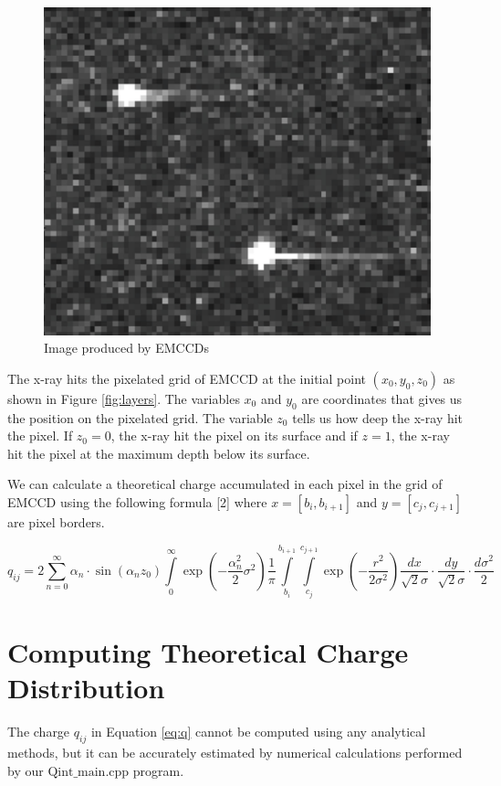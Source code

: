 \documentclass{article}
\begin{document}
\begin{figure}[H]
    \centering
    \includegraphics[width=0.6\linewidth]{images/emccd.png}
    \caption{Image produced by EMCCDs}
    \label{fig:emccd}
\end{figure}

The x-ray hits the pixelated grid of EMCCD at the initial point $(x_0, y_0, z_0)$ as shown in Figure \ref{fig:layers}. The variables $x_0$ and $y_0$ are coordinates that gives us the position on the pixelated grid. The variable $z_0$ tells us how deep the x-ray hit the pixel. If $z_0=0$, the x-ray hit the pixel on its surface and if $z=1$, the x-ray hit the pixel at the maximum depth below its surface.

We can calculate a theoretical charge accumulated in each pixel in the grid of EMCCD using the following formula [2] where $x = [b_i, b_{i+1}]$ and $y = [c_j, c_{j+1}]$ are pixel borders.

\begin{equation} 
\label{eq:q}
q_{ij} =    
 2 \sum\limits_{n=0}^\infty 
 \alpha_n  \cdot \sin(\alpha_n z_0)
  \int \limits_{0} ^\infty    \exp \left( - \frac{\alpha_n^2}{2} \sigma^2 \right) 
  \frac{1}{\pi}  \int \limits_{b_i} ^{b_{i+1}}  \int \limits_{c_j} ^{c_{j+1}}   
  \exp \left(  - \frac{r^2}{2 \sigma^2} \right) 
\frac{dx}{\sqrt{2}\sigma} \cdot \frac{dy} {\sqrt{2} \sigma} \cdot \frac{d\sigma^2}{2}
\end{equation}


\section{Computing Theoretical Charge Distribution}

The charge $q_{ij}$ in Equation \ref{eq:q} cannot be computed using any analytical methods, but it can be accurately estimated by numerical calculations performed by our $\text{Qint\_main.cpp}$ program.
\end{document}
